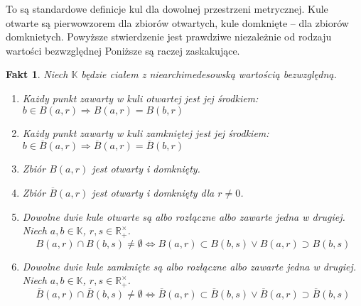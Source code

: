 \documentclass[a4paper,fleqn,9pt]{extarticle}
\newtheorem{fkt}{Fakt}
\newenvironment{enumx}{\begin{enumerate}
	\setlength{\itemsep}{0pt}
	\setlength{\parskip}{0pt}
	\setlength{\parsep}{0pt}}
{\end{enumerate}}
\begin{document}
To są standardowe definicje kul dla dowolnej przestrzeni metrycznej.
Kule otwarte są pierwowzorem dla zbiorów otwartych, kule domknięte -- dla zbiorów domknietych.
Powyższe stwierdzenie jest prawdziwe niezależnie od rodzaju wartości bezwzględnej
Poniższe są raczej zaskakujące.

\begin{fkt}
Niech $\mathbb K$ będzie ciałem z niearchimedesowską wartością bezwzględną.

\begin{enumx}
\item Każdy punkt zawarty w kuli otwartej jest jej środkiem: $b\in B(a,r) \Rightarrow B(a,r) = B(b,r)$
\item Każdy punkt zawarty w kuli zamkniętej jest jej środkiem: $b\in \overline{B}(a,r) \Rightarrow \overline{B}(a,r) = \overline{B}(b,r)$
\item Zbiór $B(a,r)$ jest otwarty i domknięty.
\item Zbiór $\overline{B}(a,r)$ jest otwarty i domknięty dla $r\neq 0$.
\item Dowolne dwie kule otwarte są albo rozłączne albo zawarte jedna w drugiej.
Niech $a,b\in\mathbb K$, $r,s\in\mathbb R_+^\times$.
\[B(a,r) \cap B(b,s) \neq \emptyset \iff B(a,r) \subset B(b,s) \vee B(a,r) \supset B(b,s)\]
\item Dowolne dwie kule zamknięte są albo rozłączne albo zawarte jedna w drugiej.
Niech $a,b\in\mathbb K$, $r,s\in\mathbb R_+^\times$.
\[\overline{B}(a,r) \cap \overline{B}(b,s) \neq \emptyset \iff \overline{B}(a,r) \subset \overline{B}(b,s) \vee \overline{B}(a,r) \supset \overline{B}(b,s)\]
\end{enumx}\end{fkt}
\end{document}
